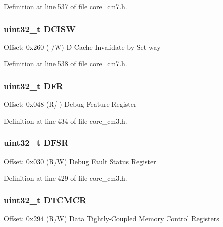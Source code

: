 Definition at line 537 of file core\+\_\+cm7.\+h.

\subsubsection[{\texorpdfstring{D\+C\+I\+SW}{DCISW}}]{ uint32\+\_\+t D\+C\+I\+SW}\hypertarget{struct_s_c_b___type_aca1ec746911b0934dd11c31d93a369be}{}\label{struct_s_c_b___type_aca1ec746911b0934dd11c31d93a369be}
Offset\+: 0x260 ( /W) D-\/\+Cache Invalidate by Set-\/way 

Definition at line 538 of file core\+\_\+cm7.\+h.

\subsubsection[{\texorpdfstring{D\+FR}{DFR}}]{ uint32\+\_\+t D\+FR}\hypertarget{struct_s_c_b___type_ae2b3d4530d1b0c05593b634dc46348bd}{}\label{struct_s_c_b___type_ae2b3d4530d1b0c05593b634dc46348bd}
Offset\+: 0x048 (R/ ) Debug Feature Register 

Definition at line 434 of file core\+\_\+cm3.\+h.

\subsubsection[{\texorpdfstring{D\+F\+SR}{DFSR}}]{ uint32\+\_\+t D\+F\+SR}\hypertarget{struct_s_c_b___type_a3b590075aa07880ce686d5cfb4e61c5c}{}\label{struct_s_c_b___type_a3b590075aa07880ce686d5cfb4e61c5c}
Offset\+: 0x030 (R/W) Debug Fault Status Register 

Definition at line 429 of file core\+\_\+cm3.\+h.

\subsubsection[{\texorpdfstring{D\+T\+C\+M\+CR}{DTCMCR}}]{ uint32\+\_\+t D\+T\+C\+M\+CR}\hypertarget{struct_s_c_b___type_ad5a9c8098433fa3ac108487e0ccd9cfc}{}\label{struct_s_c_b___type_ad5a9c8098433fa3ac108487e0ccd9cfc}
Offset\+: 0x294 (R/W) Data Tightly-\/\+Coupled Memory Control Registers 

